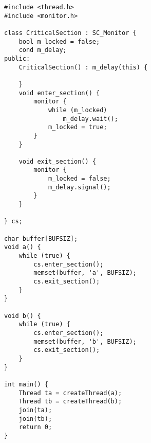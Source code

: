 \begin{lstlisting}
#include <thread.h>
#include <monitor.h>

class CriticalSection : SC_Monitor {
    bool m_locked = false;
    cond m_delay;
public:
    CriticalSection() : m_delay(this) {

    }
    void enter_section() {
        monitor {
            while (m_locked) 
                m_delay.wait();
            m_locked = true;
        }
    }

    void exit_section() {
        monitor {
            m_locked = false;
            m_delay.signal();
        }
    }

} cs;

char buffer[BUFSIZ];
void a() {
    while (true) {
        cs.enter_section();
        memset(buffer, 'a', BUFSIZ);
        cs.exit_section();
    }
}

void b() {
    while (true) {
        cs.enter_section();
        memset(buffer, 'b', BUFSIZ);
        cs.exit_section();
    }
}

int main() {
    Thread ta = createThread(a);
    Thread tb = createThread(b);
    join(ta);
    join(tb);
    return 0;
}

\end{lstlisting}
